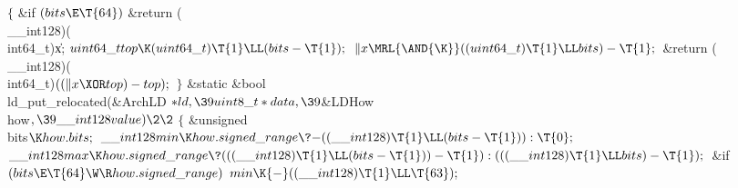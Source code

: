 ${}\{{}$\1\6
\&{if} ${}(\\{bits}\E\T{64}){}$\1\5
\&{return} (\\{\_\_int128})(\\{int64\_t})\|x;\2\6
${}\\{uint64\_t}\\{top}\K(\\{uint64\_t})\T{1}\LL(\\{bits}-\T{1});{}$\6
${}\|x\MRL{\AND{\K}}((\\{uint64\_t})\T{1}\LL\\{bits})-\T{1};{}$\6
\&{return} (\\{\_\_int128})(\\{int64\_t})${}((\|x\XOR\\{top})-\\{top});{}$\6
\4${}\}{}$\2\7
\1\1\&{static} \&{bool} \\{ld\_put\_relocated}(\&{ArchLD} ${}{*}\\{ld},\39%
\\{uint8\_t}*\\{data},\39{}$\&{LDHow} \\{how}${},\39\\{\_\_int128}\\{value})\2%
\2{}$\6
${}\{{}$\1\6
\&{unsigned} \\{bits}${}\K\\{how}.\\{bits};{}$\7
${}\\{\_\_int128}\\{min}\K\\{how}.\\{signed\_range}\?{-}((\\{\_\_int128})\T{1}%
\LL(\\{bits}-\T{1})):\T{0};{}$\6
${}\\{\_\_int128}\\{max}\K\\{how}.\\{signed\_range}\?(((\\{\_\_int128})\T{1}%
\LL(\\{bits}-\T{1}))-\T{1}):(((\\{\_\_int128})\T{1}\LL\\{bits})-\T{1});{}$\6
\&{if} ${}(\\{bits}\E\T{64}\W\R\\{how}.\\{signed\_range}){}$\1\5
${}\\{min}\K{-}((\\{\_\_int128})\T{1}\LL\T{63});{}$\2\6
